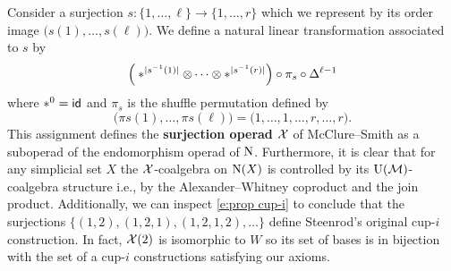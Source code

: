 Consider a surjection $s \colon \{1, \dots, \ell\} \to \{1, \dots, r\}$ which we represent by its order image $\big( s(1), \dots, s(\ell) \big)$.
We define a natural linear transformation associated to $s$ by
\begin{equation} \label{e:surjection action}
\Big( \ast^{\lvert s^{-1}(1)\rvert} \otimes \dotsb \otimes \ast^{\lvert s^{-1}(r)\rvert} \Big) \circ \pi_s \circ \Delta^{\ell-1}
\end{equation}
where $\ast^0 = \mathsf{id}$ and $\pi_s$ is the shuffle permutation defined by
\[
\big( \pi s(1), \dots, \pi s(\ell) \big) =
\big( 1, \dots, 1, \dots, r, \dots, r \big).
\]
This assignment defines the \textbf{surjection operad} $\mathcal{X}$ of McClure--Smith \cite{mcclure2003multivariable} as a suboperad of the endomorphism operad of $\operatorname{N}$.
Furthermore, it is clear that for any simplicial set $X$ the $\mathcal{X}$-coalgebra on $\operatorname{N}(X)$ is controlled by its $\operatorname{U}(\operatorname{\mathcal{M}})$-coalgebra structure i.e., by the Alexander--Whitney coproduct and the join product.
Additionally, we can inspect \cref{e:prop cup-i} to conclude that the surjections $\big\{ (1,2), (1,2,1), (1,2,1,2), \dots \big\}$ define Steenrod's original \mbox{cup-$i$} construction.
In fact, $\mathcal{X}(2)$ is isomorphic to $W$ so its set of bases is in bijection with the set of a \mbox{cup-$i$} constructions satisfying our axioms.

\subsubsection{}

